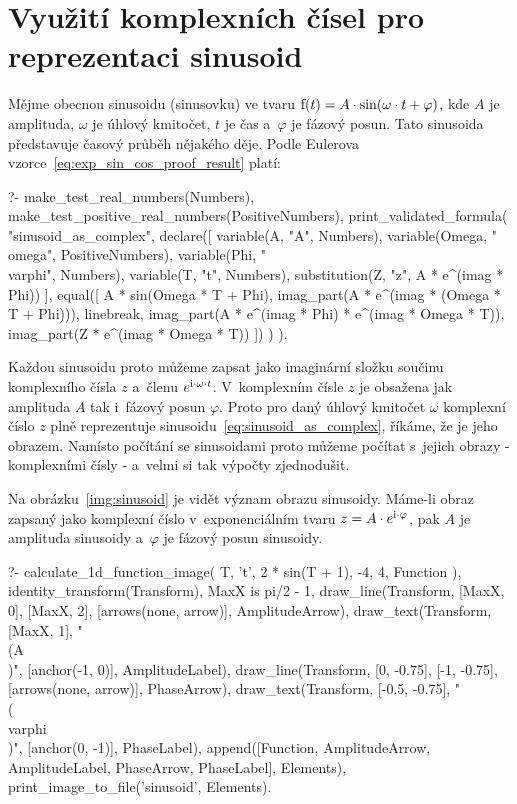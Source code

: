 \section{Využití komplexních čísel pro reprezentaci sinusoid}

Mějme obecnou sinusoidu (sinusovku) ve tvaru \(\mathrm{f}(t) = A \cdot \sin(\omega \cdot t + \varphi)\), kde \(A\) je amplituda, \(\omega\) je úhlový kmitočet, \(t\) je čas a~\(\varphi\) je fázový posun. Tato sinusoida představuje časový průběh nějakého děje.  Podle Eulerova vzorce~\eqref{eq:exp_sin_cos_proof_result} platí:

\begin{prolog}
?-	make_test_real_numbers(Numbers),
	make_test_positive_real_numbers(PositiveNumbers),
	print_validated_formula(
		"sinusoid_as_complex",
		declare([
			variable(A, "A", Numbers),
			variable(Omega, "\\omega", PositiveNumbers),
			variable(Phi, "\\varphi", Numbers),
			variable(T, "t", Numbers),
			substitution(Z, "z", A * e^(imag * Phi))
		],
			equal([
				A * sin(Omega * T + Phi),
				imag_part(A * e^(imag * (Omega * T + Phi))),
				linebreak,
				imag_part(A * e^(imag * Phi) * e^(imag * Omega * T)),
				imag_part(Z * e^(imag * Omega * T))
			])
		)
	).
\end{prolog}

Každou sinusoidu proto můžeme zapsat jako imaginární složku součinu komplexního čísla \(z\) a~členu \(e^{\mathrm{i} \cdot \omega \cdot t}\). V~komplexním čísle \(z\) je obsažena jak amplituda \(A\) tak i~fázový posun \(\varphi\). Proto pro daný úhlový kmitočet \(\omega\) komplexní číslo \(z\) plně reprezentuje sinusoidu~\eqref{eq:sinusoid_as_complex}, říkáme, že je jeho obrazem. Namísto počítání se sinusoidami proto můžeme počítat s~jejich obrazy - komplexními čísly - a~velmi si tak výpočty zjednodušit. 

Na obrázku~\ref{img:sinusoid} je vidět význam obrazu sinusoidy. Máme-li obraz zapsaný jako komplexní číslo v~exponenciálním tvaru \(z = A \cdot e^{\mathrm{i} \cdot \varphi}\), pak \(A\) je amplituda sinusoidy a~\(\varphi\) je fázový posun sinusoidy.

\begin{prolog}
?-	calculate_1d_function_image(
		T,
		't',
		2 * sin(T + 1),
		-4, 4,
		Function
	),
	identity_transform(Transform),
	MaxX is pi/2 - 1,
	draw_line(Transform, [MaxX, 0], [MaxX, 2], [arrows(none, arrow)], AmplitudeArrow),
	draw_text(Transform, [MaxX, 1], "\\(A\\)", [anchor(-1, 0)], AmplitudeLabel),
	draw_line(Transform, [0, -0.75], [-1, -0.75], [arrows(none, arrow)], PhaseArrow),
	draw_text(Transform, [-0.5, -0.75], "\\(\\varphi\\)", [anchor(0, -1)], PhaseLabel),
	append([Function, AmplitudeArrow, AmplitudeLabel, PhaseArrow, PhaseLabel], Elements),
	print_image_to_file('sinusoid', Elements).
\end{prolog}

